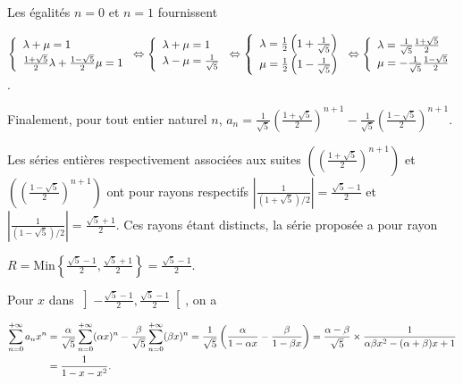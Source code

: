 {{\begin{enumerate}
Les égalités $n=0$ et $n=1$ fournissent

\begin{center}
$\left\{
\begin{array}{l}
\rule[-2mm]{0mm}{0mm}\lambda+\mu=1\\
\frac{1+\sqrt{5}}{2}\lambda+\frac{1-\sqrt{5}}{2}\mu=1
\end{array}
\right.\Leftrightarrow\left\{
\begin{array}{l}
\rule[-2mm]{0mm}{0mm}\lambda+\mu=1\\
\lambda-\mu=\frac{1}{\sqrt{5}}
\end{array}
\right.\Leftrightarrow
\left\{
\begin{array}{l}
\lambda=\frac{1}{2}\left(1+\frac{1}{\sqrt{5}}\right)\\
\mu=\frac{1}{2}\left(1-\frac{1}{\sqrt{5}}\right)\end{array}
\right.\Leftrightarrow\left\{
\begin{array}{l}
\lambda=\frac{1}{\sqrt{5}}\frac{1+\sqrt{5}}{2}\\
\mu=-\frac{1}{\sqrt{5}}\frac{1-\sqrt{5}}{2}
\end{array}
\right.$.
\end{center}

Finalement, pour tout entier naturel $n$, $a_n =\frac{1}{\sqrt{5}}\left(\frac{1+\sqrt{5}}{2}\right)^{n+1}-\frac{1}{\sqrt{5}}\left(\frac{1-\sqrt{5}}{2}\right)^{n+1}$.

Les séries entières respectivement associées aux suites $\left(\left(\frac{1+\sqrt{5}}{2}\right)^{n+1}\right)$ et $\left(\left(\frac{1-\sqrt{5}}{2}\right)^{n+1}\right)$ ont pour rayons respectifs $\left|\frac{1}{(1+\sqrt{5})/2}\right|=\frac{\sqrt{5}-1}{2}$ et $\left|\frac{1}{(1-\sqrt{5})/2}\right|=\frac{\sqrt{5}+1}{2}$. Ces rayons étant distincts, la série proposée a pour rayon

\begin{center}
$R=\text{Min}\left\{\frac{\sqrt{5}-1}{2},\frac{\sqrt{5}+1}{2}\right\}=\frac{\sqrt{5}-1}{2}$.
\end{center}

Pour $x$ dans $\left]-\frac{\sqrt{5}-1}{2},\frac{\sqrt{5}-1}{2}\right[$, on a

\begin{align*}\ensuremath
\sum_{n=0}^{+\infty}a_nx^n&=\frac{\alpha}{\sqrt{5}}\sum_{n=0}^{+\infty}(\alpha x)^n -\frac{\beta}{\sqrt{5}}\sum_{n=0}^{+\infty}(\beta x)^n
=\frac{1}{\sqrt{5}}\left(\frac{\alpha}{1-\alpha x}-\frac{\beta}{1-\beta x}\right)
=\frac{\alpha-\beta}{\sqrt{5}}\times\frac{1}{\alpha\beta x^2-(\alpha+\beta)x+1}\\
 &=\frac{1}{1-x-x^2}.
\end{align*}


\end{enumerate}}}
